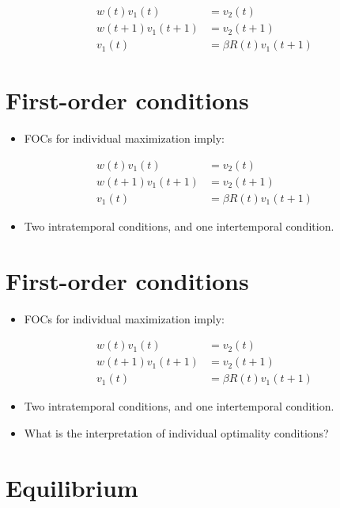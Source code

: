 \documentclass[10pt]{article}
\begin{document}
$$
\begin{aligned}
w(t) v_{1}(t) & =v_{2}(t) \\
w(t+1) v_{1}(t+1) & =v_{2}(t+1) \\
v_{1}(t) & =\beta R(t) v_{1}(t+1)
\end{aligned}
$$

\section*{First-order conditions}
\begin{itemize}
  \item FOCs for individual maximization imply:
\end{itemize}

$$
\begin{aligned}
w(t) v_{1}(t) & =v_{2}(t) \\
w(t+1) v_{1}(t+1) & =v_{2}(t+1) \\
v_{1}(t) & =\beta R(t) v_{1}(t+1)
\end{aligned}
$$

\begin{itemize}
  \item Two intratemporal conditions, and one intertemporal condition.
\end{itemize}

\section*{First-order conditions}
\begin{itemize}
  \item FOCs for individual maximization imply:
\end{itemize}

$$
\begin{aligned}
w(t) v_{1}(t) & =v_{2}(t) \\
w(t+1) v_{1}(t+1) & =v_{2}(t+1) \\
v_{1}(t) & =\beta R(t) v_{1}(t+1)
\end{aligned}
$$

\begin{itemize}
  \item Two intratemporal conditions, and one intertemporal condition.
  \item What is the interpretation of individual optimality conditions?
\end{itemize}

\section*{Equilibrium}
\end{document}
